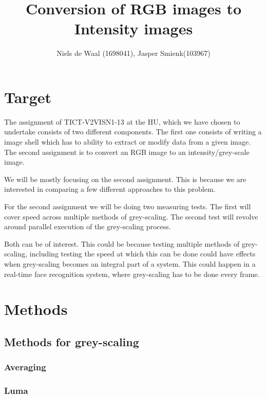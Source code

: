 \documentclass[a4paper]{article}
\begin{document}
\title{Conversion of RGB images to Intensity images}
\author{Niels de Waal (1698041), Jasper Smienk(103967)}
\maketitle
\newpage

\tableofcontents
\newpage

\section{Target}
The assignment of TICT-V2VISN1-13 at the HU, which we have chosen to undertake consists of two different components.
The first one consists of writing a image shell which has to ability to extract or modify data from a given image.
The second assignment is to convert an RGB image to an intensity/grey-scale image. 

We will be mostly focusing on the second assignment. This is because we are interested in comparing a few different approaches to this problem.

For the second assignment we will be doing two measuring tests. The first will cover speed across multiple methods of grey-scaling. The second test will revolve around parallel execution of the grey-scaling process.

Both can be of interest. This could be because testing multiple methods of grey-scaling, including testing the speed at which this can be done could have effects when grey-scaling becomes an integral part of a system. This could happen in a real-time face recognition system, where grey-scaling has to be done every frame.

\section{Methods}

\subsection{Methods for grey-scaling}
\subsubsection{Averaging}

\subsubsection{Luma}
\end{document}
